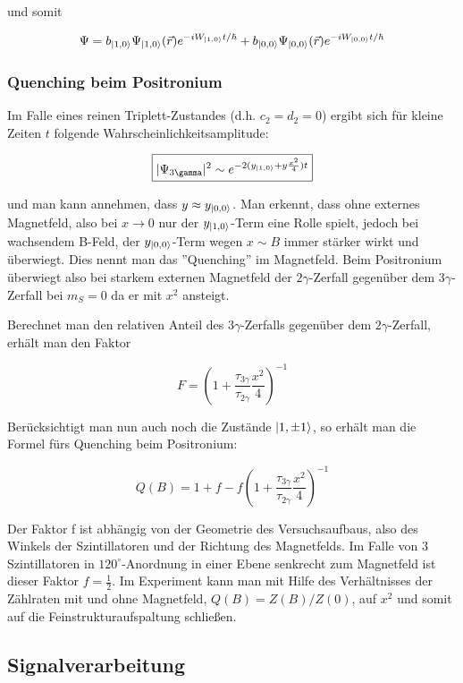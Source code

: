und somit

$$ \Psi = b_{\ket{1,0}}\Psi_{\ket{1,0}}(\vec r)e^{-iW_{\ket{1,0}}t/\hbar} + b_{\ket{0,0}}\Psi_{\ket{0,0}}(\vec r)e^{-iW_{\ket{0,0}}t/\hbar} $$

\subsubsection{Quenching beim Positronium}

Im Falle eines reinen Triplett-Zustandes (d.h. $c_2=d_2=0$) ergibt sich für kleine Zeiten $t$ folgende Wahrscheinlichkeitsamplitude:

\begin{equation} \boxed{ |\Psi_{3\gamma}|^2 \sim e^{-2(y_{\ket{1,0}}+y\frac{x^2}{4})t} } \end{equation}

und man kann annehmen, dass $y \approx y_{\ket{0,0}}$. Man erkennt, dass ohne externes Magnetfeld, also bei $x\to 0$ nur der $y_{\ket{1,0}}$-Term eine Rolle spielt, jedoch bei wachsendem B-Feld, der $y_{\ket{0,0}}$-Term wegen $x \sim B$ immer stärker wirkt und überwiegt. Dies nennt man das ''Quenching'' im Magnetfeld. Beim Positronium überwiegt also bei starkem externen Magnetfeld der $2\gamma$-Zerfall gegenüber dem $3\gamma$-Zerfall bei $m_S = 0$ da er mit $x^2$ ansteigt.

Berechnet man den relativen Anteil des $3\gamma$-Zerfalls gegenüber dem $2\gamma$-Zerfall, erhält man den Faktor

$$ F = \left( 1+\frac{\tau_{3\gamma}}{\tau_{2\gamma}}\frac{x^2}{4}\right)^{-1} $$

Berücksichtigt man nun auch noch die Zustände $\ket{1,\pm1}$, so erhält man die Formel fürs Quenching beim Positronium:

\begin{equation} \boxed{Q(B) = 1 + f - f\left( 1+\frac{\tau_{3\gamma}}{\tau_{2\gamma}}\frac{x^2}{4}\right)^{-1}} \end{equation}

Der Faktor f ist abhängig von der Geometrie des Versuchsaufbaus, also des Winkels der Szintillatoren und der Richtung des Magnetfelds. Im Falle von 3 Szintillatoren in $120^\circ$-Anordnung in einer Ebene senkrecht zum Magnetfeld ist dieser Faktor $f=\frac{1}{2}$. Im Experiment kann man mit Hilfe des Verhältnisses der Zählraten mit und ohne Magnetfeld, $Q(B) = Z(B) / Z(0)$,  auf $x^2$ und somit auf die Feinstrukturaufspaltung schließen.

\subsection{Signalverarbeitung}


